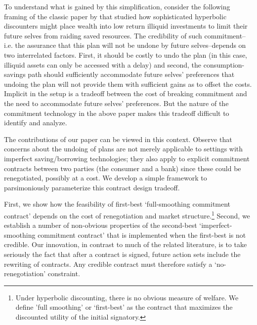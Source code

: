 \documentclass[11pt,english]{article}
\theoremstyle{plain}
\theoremstyle{definition}
\begin{document}
To understand what is gained by this simplification, consider the following framing of the classic paper by \citet{laibson1997} that studied how sophisticated hyperbolic discounters might place wealth into low return illiquid investments to limit their future selves from raiding saved resources. The credibility of such commitment--i.e. the assurance that this plan will not be undone by future selves--depends on two interrelated factors. First, it should be costly to undo the plan (in this case, illiquid assets can only be accessed with a delay) and second, the consumption-savings path should sufficiently accommodate future selves' preferences that undoing the plan will not provide them with sufficient gains as to offset the costs. Implicit in the setup is a tradeoff between the cost of breaking commitment and the need to accommodate future selves' preferences. But the nature of the commitment technology in the above paper makes this tradeoff difficult to identify and analyze.

The contributions of our paper can be viewed in this context. Observe that concerns about the undoing of plans are not merely applicable to settings with imperfect saving/borrowing technologies; they also apply to explicit commitment contracts between two parties (the consumer and a bank) since these could be renegotiated, possibly at a cost. We develop a simple framework to parsimoniously parameterize this contract design tradeoff.  

First, we show how the feasibility
of first-best `full-smoothing commitment contract' depends on the
cost of renegotiation and market structure.\footnote{Under hyperbolic discounting, there is no obvious measure of welfare.
We define 'full smoothing' or `first-best' as the contract that maximizes the discounted
utility of the initial signatory.} Second, we establish a number of non-obvious properties of the second-best
`imperfect-smoothing commitment contract' that is implemented when
the first-best is not credible. Our innovation, in contrast to much
of the related literature, is to take seriously the fact that after a contract is signed, future action sets include the rewriting of contracts. Any credible contract must therefore satisfy a `no-renegotiation' constraint.
\end{document}
